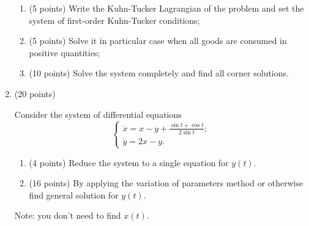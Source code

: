 \begin{enumerate}
\begin{enumerate}
  \item (5 points) Write the Kuhn-Tucker Lagrangian of the problem and set the system of first-order Kuhn-Tucker conditions;
  \item (5 points) Solve it in particular case when all goods are consumed in positive quantities;
  \item (10 points) Solve the system completely and find all corner solutions.
\end{enumerate}

\item (20 points)

Consider the system of differential equations
\[
\begin{cases}
\dot x = x - y + \frac{\sin t + \cos t}{2 \sin t}; \\
\dot y = 2x - y.
\end{cases}
\]

\begin{enumerate}
  \item (4 points) Reduce the system to a single equation for $y(t)$.
  \item (16 points) By applying the variation of parameters method or otherwise find general solution for $y(t)$.
\end{enumerate}

Note: you don't need to find $x(t)$.

\end{enumerate}
